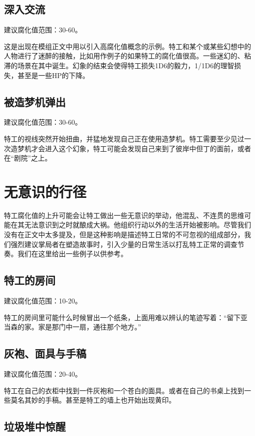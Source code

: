 \subsection{深入交流}

建议腐化值范围：30-60。

这是出现在模组正文中用以引入高腐化值概念的示例。特工和某个或某些幻想中的人物进行了迷醉的接触，比如用作例子的如果特工的腐化值很高。一些迷幻的、粘滞的场景在其中诞生。幻象的结束会使得特工损失1D6的毅力，1/1D6的理智损失，甚至是一些HP的下降。

\subsection{被造梦机弹出}

建议腐化值范围：30-60。

特工的视线突然开始扭曲，并猛地发现自己正在使用造梦机。特工需要至少见过一次造梦机才会进入这个幻象，特工可能会发现自己来到了彼岸中但丁的面前，或者在“剧院”之上。

\section{无意识的行径}

特工腐化值的上升可能会让特工做出一些无意识的举动，他混乱、不连贯的思维可能在其无法意识到之时就酿成大祸。他组织行动以外的生活开始被影响。尽管我们没有在正文中太多提及，但是这种影响是描述特工日常的不可忽视的组成部分，我们强烈建议掌局者在塑造故事时，引入少量的日常生活以打乱特工正常的调查节奏。我们在这里给出一些例子以供参考。

\subsection{特工的房间}

建议腐化值范围：10-20。

特工的房间里可能什么时候冒出一个纸条，上面用难以辨认的笔迹写着：“留下亚当森的家。家是那门中一扇，通往那个地方。”

\subsection{灰袍、面具与手稿}

建议腐化值范围：20-40。

特工在自己的衣柜中找到一件灰袍和一个苍白的面具。或者在自己的书桌上找到一些莫名其妙的手稿。甚至是特工的墙上也开始出现黄印。

\subsection{垃圾堆中惊醒}


